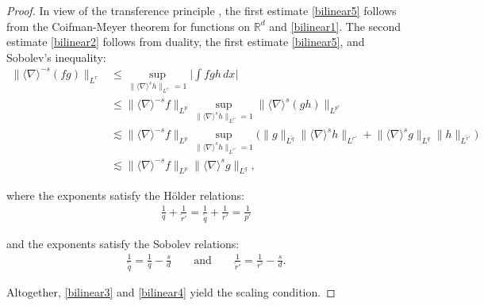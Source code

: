 \documentclass[letterpaper, 11pt,  reqno]{amsart}
\newtheorem{remark}[theorem]{Remark}
\newcommand{\1}{\hspace{0.5mm}\text{I}\hspace{0.5mm}}
\newcommand{\noi}{\noindent}
\newcommand{\R}{\mathbb{R}}
\newcommand{\nb}{\nabla}
\newcommand{\wt}{\widetilde}
\newcommand{\les}{\lesssim}
\newcommand{\jb}[1]
{\langle #1 \rangle}
\numberwithin{equation}{section}
\numberwithin{theorem}{section}
\newcommand{\noteherbert}[1]{\marginpar{\color{red} $\Leftarrow\Leftarrow\Leftarrow$}{\color{purple}Herbert: #1}}
\begin{document}
\begin{proof} 
In view of the transference principle \cite[Theorem 3]{FS}, 
the first estimate \eqref{bilinear5} follows from the Coifman-Meyer theorem 
for functions on $\R^d$
and \eqref{bilinear1}.
 The second estimate \eqref{bilinear2} follows 
 from  duality, the first estimate \eqref{bilinear5}, and Sobolev's inequality:
\begin{align*}
  \big\| \jb{\nb}^{-s} (fg) \big\|_{L^r} 
  & \le  \sup_{\|\jb{\nb}^s h \|_{L^{r'}} =1}  \bigg|\int fgh \, dx \bigg|\\
 & \le \big\| \jb{\nb}^{-s} f \big\|_{L^p}   \sup_{\| \jb{\nb}^s h \|_{L^{r'}} =1} 
 \big\| \jb{\nb}^{s} (gh) \big\|_{L^{p'}} \\
 &  \les \big\| \jb{\nb}^{-s} f \big\|_{L^p}  
 \sup_{\| \jb{\nb}^s h \|_{L^{r'}} = 1} \Big( \| g \|_{L^{\wt  q}} \big\| \jb{\nb}^s h \big\|_{L^{r'}} 
+ \big\|\jb{\nb}^s g \big\|_{L^q} \| h \|_{L^{\wt r'} } \Big) \\
 &  \lesssim   \big\| \jb{\nb}^{-s} f \big\|_{L^p} \big\| \jb{\nb}^s g \big\|_{L^q}   , 
\end{align*}


\noi
where the exponents satisfy the H\"older relations: 
\begin{align}
 \frac1q + \frac1{\wt r'} = \frac1{\wt q} + \frac1{r'}=\frac{1}{p'} 
\label{bilinear3}
\end{align}

\noi
and 
the exponents satisfy the Sobolev relations: 
\begin{align}
 \frac1{\wt q} = \frac1q -\frac{s}{d}  
  \qquad \text{and}\qquad
  \frac1{\wt r'} = \frac1{r'} - \frac{s}d.  
\label{bilinear4}
\end{align}

\noi
Altogether, \eqref{bilinear3} and \eqref{bilinear4} yield the scaling condition. 
\end{proof} 


%
%
%
%
\end{document}
